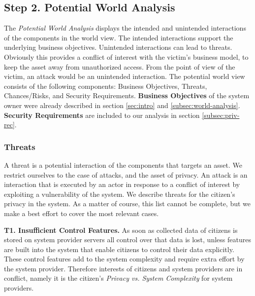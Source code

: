 \documentclass[runningheads,a4paper]{llncs}
\begin{document}
\subsection{Step 2. Potential World Analysis}
\label{subsec:pot-analysis}

The \emph{Potential World Analysis} displays the intended and unintended interactions of the components in the world view. The intended interactions support the underlying business objectives. Unintended interactions can lead to threats. Obviously this provides a conflict of interest with the victim's business model, to keep the asset away from unauthorized access. From the point of view of the victim, an attack would be an unintended interaction. The potential world view consists of the following components: Business Objectives, Threats, Chances/Risks, and Security Requirements. 
\textbf{Business Objectives} of the system owner were already described in section \ref{sec:intro} and \ref{subsec:world-analysis}. \textbf{Security Requirements} are included to our analysis in section \ref{subsec:priv-rec}.


\subsubsection{Threats}

A threat is a potential interaction of the components that targets an asset.
We restrict ourselves to the case of attacks, and the asset of privacy.
An attack is an interaction that is executed by an actor in response to a conflict of interest by exploiting a vulnerability of the system. We describe threats for the citizen's privacy in the system. As a matter of course, this list cannot be complete, but we make a best effort to cover the most relevant cases.

\textbf{T1. Insufficient Control Features.}
As soon as collected data of citizens is stored on system provider servers all control over that data is lost,
unless features are built into the system that enable citizens to control their data explicitly.
These control features add to the system complexity and require extra effort by the system provider.
Therefore interests of citizens and system providers are in conflict, namely it is the citizen's \textit{Privacy vs. System Complexity} for system providers.
\end{document}
